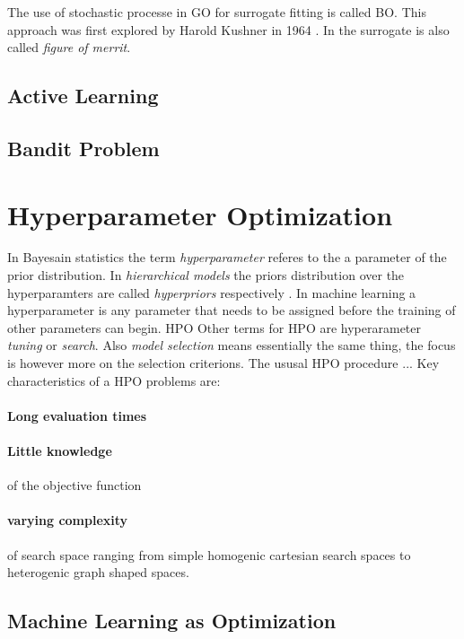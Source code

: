 \documentclass[english]{article}
\begin{document}
The use of stochastic processe in \ac{GO} for surrogate fitting is called \ac{BO}. This approach was first explored by Harold Kushner in 1964 \cite{kushner_new_1964}. In \cite{jones_efficient_1998} the surrogate is also called \textit{figure of merrit}.


\subsection{Active Learning}


\subsection{Bandit Problem}


\section{Hyperparameter Optimization}
In Bayesain statistics the term \textit{hyperparameter} referes to the a parameter of the prior distribution. In \textit{hierarchical models} the priors distribution over the hyperparamters are called \textit{hyperpriors} respectively \cite[p.408]{bishop_neural_1995}. In \acf{machine learning} a hyperparameter is any parameter that needs to be assigned before the training of other parameters can begin.
\acf{HPO} Other terms for \ac{HPO} are hyperarameter \textit{tuning} or \textit{search}. Also \textit{model selection} means essentially the same thing, the focus is however more on the selection criterions.
The ususal \ac{HPO} procedure ...
Key characteristics of a \ac{HPO} problems are:
\paragraph{Long evaluation times}
\paragraph{Little knowledge} of the objective function
\paragraph{varying complexity} of search space ranging from simple homogenic cartesian search spaces to heterogenic graph shaped spaces.

\subsection{Machine Learning as Optimization}
\end{document}
